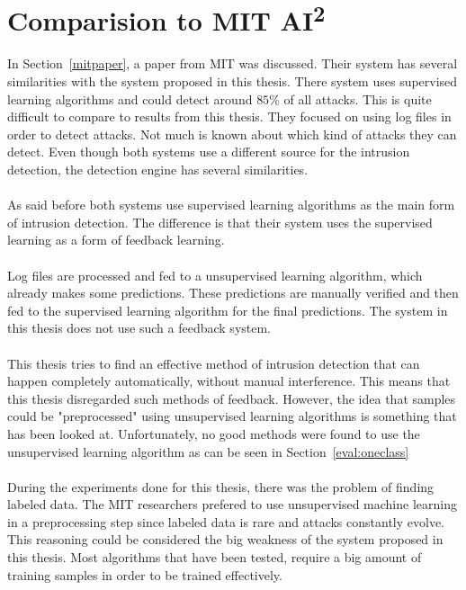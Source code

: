 \section{Comparision to MIT AI\textsuperscript{2}}
\label{compAI}
In Section~\ref{mitpaper}, a paper from MIT was discussed. Their system has several similarities with the system proposed in this thesis. There system uses supervised learning algorithms and could detect around $85$\% of all attacks. This is quite difficult to compare to results from this thesis. They focused on using log files in order to detect attacks. Not much is known about which kind of attacks they can detect. Even though both systems use a different source for the intrusion detection, the detection engine has several similarities. \\
\\
As said before both systems use supervised learning algorithms as the main form of intrusion detection. The difference is that their system uses the supervised learning as a form of feedback learning. \\
\\
Log files are processed and fed to a unsupervised learning algorithm, which already makes some predictions. These predictions are manually verified and then fed to the supervised learning algorithm for the final predictions. The system in this thesis does not use such a feedback system. \\
\\
This thesis tries to find an effective method of intrusion detection that can happen completely automatically, without manual interference. This means that this thesis disregarded such methods of feedback. However, the idea that samples could be "preprocessed" using unsupervised learning algorithms is something that has been looked at. Unfortunately, no good methods were found to use the unsupervised learning algorithm as can be seen in Section~\ref{eval:oneclass} \\
\\
During the experiments done for this thesis, there was the problem of finding labeled data. The MIT researchers prefered to use unsupervised machine learning in a preprocessing step since labeled data is rare and attacks constantly evolve. This reasoning could be considered the big weakness of the system proposed in this thesis. Most algorithms that have been tested, require a big amount of training samples in order to be trained effectively.
